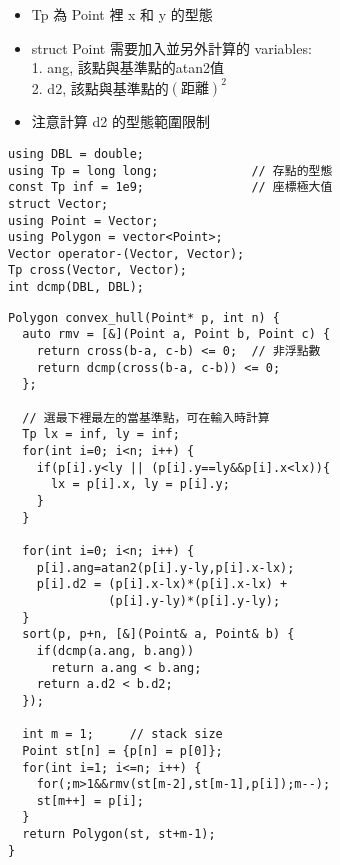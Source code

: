 \begin{itemize}
    \item Tp 為 Point 裡 x 和 y 的型態
    \item struct Point 需要加入並另外計算的 variables: \\
        1. ang, 該點與基準點的atan2值 \\
        2. d2, 該點與基準點的$(距離)^2$
    \item 注意計算 d2 的型態範圍限制
\end{itemize}

\begin{center}
\begin{lstlisting}
using DBL = double;
using Tp = long long;             // 存點的型態
const Tp inf = 1e9;               // 座標極大值
struct Vector;
using Point = Vector;
using Polygon = vector<Point>;
Vector operator-(Vector, Vector);
Tp cross(Vector, Vector);
int dcmp(DBL, DBL);
\end{lstlisting}
\begin{lstlisting}
Polygon convex_hull(Point* p, int n) {
  auto rmv = [&](Point a, Point b, Point c) {
    return cross(b-a, c-b) <= 0;  // 非浮點數
    return dcmp(cross(b-a, c-b)) <= 0;
  };

  // 選最下裡最左的當基準點，可在輸入時計算
  Tp lx = inf, ly = inf;
  for(int i=0; i<n; i++) {
    if(p[i].y<ly || (p[i].y==ly&&p[i].x<lx)){
      lx = p[i].x, ly = p[i].y;
    } 
  }

  for(int i=0; i<n; i++) {
    p[i].ang=atan2(p[i].y-ly,p[i].x-lx);
    p[i].d2 = (p[i].x-lx)*(p[i].x-lx) +
              (p[i].y-ly)*(p[i].y-ly);
  }
  sort(p, p+n, [&](Point& a, Point& b) {
    if(dcmp(a.ang, b.ang))
      return a.ang < b.ang;
    return a.d2 < b.d2;
  });

  int m = 1;     // stack size
  Point st[n] = {p[n] = p[0]};
  for(int i=1; i<=n; i++) {
    for(;m>1&&rmv(st[m-2],st[m-1],p[i]);m--);
    st[m++] = p[i];
  }
  return Polygon(st, st+m-1);
}
\end{lstlisting}
\end{center}